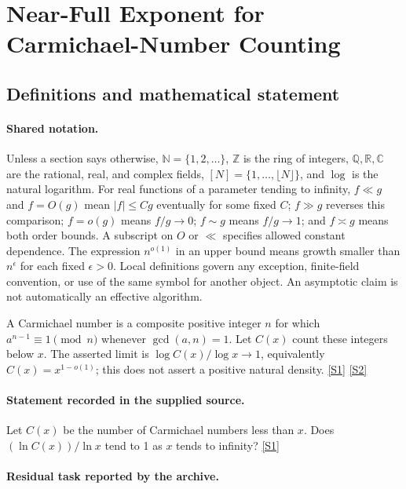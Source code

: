 \documentclass[11pt,a4paper]{article}
\newcommand{\N}{\mathbb{N}}
\newcommand{\Z}{\mathbb{Z}}
\newcommand{\Q}{\mathbb{Q}}
\newcommand{\R}{\mathbb{R}}
\newcommand{\C}{\mathbb{C}}
\newcommand{\sref}[2]{\hyperlink{source:#1:#2}{[S#2]}}
\begin{document}
\section{Near-Full Exponent for Carmichael-Number Counting}\label{statement}


\subsection{Definitions and mathematical statement}

\paragraph{Shared notation.}Unless a section says otherwise, $\N=\{1,2,\ldots\}$,
$\Z$ is the ring of integers, $\Q,\R,\C$ are the rational, real, and complex
fields, $[N]=\{1,\ldots,\lfloor N\rfloor\}$, and $\log$ is the natural
logarithm. For real functions of a parameter tending to infinity,
$f\ll g$ and $f=O(g)$ mean $|f|\leq Cg$ eventually for some fixed $C$;
$f\gg g$ reverses this comparison; $f=o(g)$ means $f/g\to0$;
$f\sim g$ means $f/g\to1$; and $f\asymp g$ means both order bounds.
A subscript on $O$ or $\ll$ specifies allowed constant dependence.
The expression $n^{o(1)}$ in an upper bound means growth smaller than
$n^\epsilon$ for each fixed $\epsilon>0$. Local definitions govern any
exception, finite-field convention, or use of the same symbol for another
object. An asymptotic claim is not automatically an effective algorithm.



A Carmichael number is a composite positive integer $n$ for which $a^{n-1}\equiv1\pmod n$ whenever $\gcd(a,n)=1$. Let $C(x)$ count these integers below $x$. The asserted limit is $\log C(x)/\log x\to1$, equivalently $C(x)=x^{1-o(1)}$; this does not assert a positive natural density. \sref{statement}{1} \sref{statement}{2}

\paragraph{Statement recorded in the supplied source.}
Let $C(x)$ be the number of Carmichael numbers less than $x$. Does $(\ln C(x))/\ln x$ tend to 1 as $x$ tends to infinity? \sref{statement}{1}

\paragraph{Residual task reported by the archive.}
\end{document}
